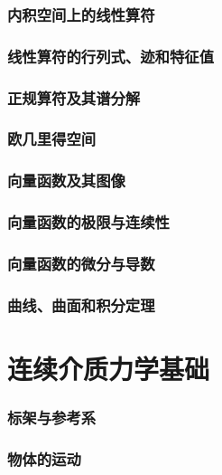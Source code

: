 \documentclass[zihao=-4,linespread=1.5,heading=true,a4paper,twoside]{ctexart}
\begin{document}
\section{内积空间上的线性算符}\label{sec:II.6}


\section{线性算符的行列式、迹和特征值}\label{sec:II.7}


\section{正规算符及其谱分解}\label{sec:II.8}


\section{欧几里得空间}


\section{向量函数及其图像}


\section{向量函数的极限与连续性}


\section{向量函数的微分与导数}


\section{曲线、曲面和积分定理}


\newpage\part{连续介质力学基础}
\section{标架与参考系}


\section{物体的运动}

\end{document}
